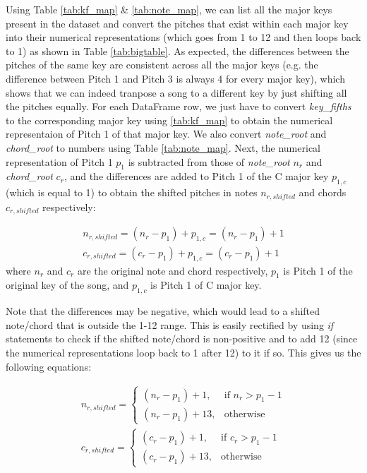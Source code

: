 Using Table \cref{tab:kf_map} \& \cref{tab:note_map}, we can list all the major keys present in the dataset and convert the pitches that exist within each major key into their numerical representations (which goes from 1 to 12 and then loops back to 1) as shown in Table \cref{tab:bigtable}. As expected, the differences between the pitches of the same key are consistent across all the major keys (e.g. the difference between Pitch 1 and Pitch 3 is always 4 for every major key), which shows that we can indeed tranpose a song to a different key by just shifting all the pitches equally. For each DataFrame row, we just have to convert \emph{key\_fifths} to the corresponding major key using \cref{tab:kf_map} to obtain the numerical representaion of Pitch 1 of that major key. We also convert \emph{note\_root} and \emph{chord\_root} to numbers using Table \cref{tab:note_map}. Next, the numerical representation of Pitch 1 $p_1$ is subtracted from those of \emph{note\_root} $n_r$ and \emph{chord\_root} $c_r$, and the differences are added to Pitch 1 of the C major key $p_{1,c}$ (which is equal to 1) to obtain the shifted pitches in notes $n_{r,shifted}$ and chords $c_{r,shifted}$ respectively: 

\begin{align} 
    \label{shift note 1}
    n_{r,shifted} = (n_r-p_1)+p_{1,c} = (n_r-p_1)+1\\
    \label{shift chord 2}
    c_{r,shifted} =(c_r-p_1)+p_{1,c} = (c_r-p_1)+1
\end{align}
where $n_r$ and $c_r$ are the original note and chord respectively, $p_1$ is Pitch 1 of the original key of the song, and $p_{1,c}$ is Pitch 1 of C major key.

Note that the differences may be negative, which would lead to a shifted note/chord that is outside the 1-12 range. This is easily rectified by using \emph{if} statements to check if the shifted note/chord is non-positive and to add 12 (since the numerical representations loop back to 1 after 12) to it if so. This gives us the following equations:

\begin{align}
    \label{shift note 2}
    n_{r,shifted}= 
\begin{cases}
    (n_r-p_1)+1,& \text{if } n_r > p_1-1\\
    (n_r-p_1)+13,              & \text{otherwise}
\end{cases}\\
c_{r,shifted}= 
\begin{cases}
    (c_r-p_1)+1,& \text{if } c_r > p_1-1\\
    (c_r-p_1)+13,              & \text{otherwise}
\end{cases}
\end{align}


